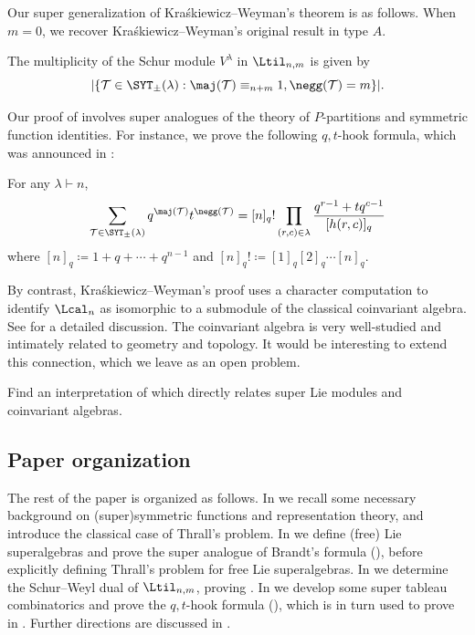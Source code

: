 Our super generalization of Kra{\'s}kiewicz--Weyman's theorem is as follows. When $m=0$, we recover Kra{\'s}kiewicz--Weyman's original result \cite{KW} in type $A$.
\begin{thm}\label{thm:super-KW}
    The multiplicity of the Schur module $V^\lambda$ in $\Ltil_{n,m}$ is given by
    \begin{equation}\label{eq:super-KW}
        |\{ \mathcal{T} \in \SYT_\pm(\lambda) : \maj(\mathcal{T}) \equiv_{n+m} 1, \negg(\mathcal{T}) = m \}|.
    \end{equation}
\end{thm}

Our proof of  involves super analogues of the theory of $P$-partitions and symmetric function identities. For instance, we prove the following $q,t$-hook formula, which was announced in \cite[(6.1)]{BS}:
\begin{thm}\label{thm:maj-neg-hook}
    For any $\lambda \vdash n$,
    \begin{equation}\label{eq:maj-neg-hook}
        \sum_{\mathcal{T} \in \SYT_\pm(\lambda)} q^{\maj(\mathcal{T})} t^{\negg(\mathcal{T})} = [n]_q! \prod_{(r, c) \in \lambda} \frac{q^{r-1} + tq^{c-1}}{[h(r, c)]_q}
    \end{equation}
    where $[n]_q \coloneqq 1 + q + \cdots + q^{n-1}$ and $[n]_q! \coloneqq [1]_q[2]_q \cdots [n]_q$.
\end{thm}

By contrast, Kra{\'s}kiewicz--Weyman's proof uses a character computation to identify $\Lcal_n$ as isomorphic to a submodule of the classical coinvariant algebra. See \cite[\S 8]{Gar} for a detailed discussion. The coinvariant algebra is very well-studied and intimately related to geometry and topology. It would be interesting to extend this connection, which we leave as an open problem.
\begin{prob}
    Find an interpretation of  which directly relates super Lie modules and coinvariant algebras.
\end{prob}

\subsection{Paper organization}
 The rest of the paper is organized as follows. In  we recall some necessary background on (super)symmetric functions and representation theory, and introduce the classical case of Thrall's problem. In  we define (free) Lie superalgebras and prove the super analogue of Brandt's formula (), before explicitly defining Thrall's problem for free Lie superalgebras. In  we determine the Schur--Weyl dual of $\Ltil_{n,m}$, proving . In  we develop some super tableau combinatorics and prove the $q,t$-hook formula (), which is in turn used to prove  in . Further directions are discussed in .

